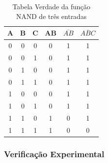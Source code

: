 \documentclass[12pt]{article}
\begin{document}
\begin{table}[H]

    \centering

    \caption{Tabela Verdade da função NAND de três entradas}

    \label{tab:tabela-nand-3}

    \begin{tabular}{|c|c|c|c|c|c|}
    
        \hline
        
        A & B & C & AB & \(\overline{AB}\) & \(\overline{ABC}\)\\
        
        \hline
        
        0 & 0 & 0 & 0 & 1 & 1 \\
        
        \hline
        
        0 & 0 & 1 & 0 & 1 & 1 \\
        
        \hline
        
        0 & 1 & 0 & 0 & 1 & 1 \\
        
        \hline
        
        0 & 1 & 1 & 0 & 1 & 1 \\
        
        \hline
        
        1 & 0 & 0 & 0 & 1 & 1 \\
        
        \hline
        
        1 & 0 & 1 & 0 & 1 & 1 \\
        
        \hline
        
        1 & 1 & 0 & 1 & 0 & 1 \\
        
        \hline
        
        1 & 1 & 1 & 1 & 0 & 0 \\
        
        \hline
        
    \end{tabular}

\end{table}

\subsubsection{Verificação Experimental}
\end{document}
